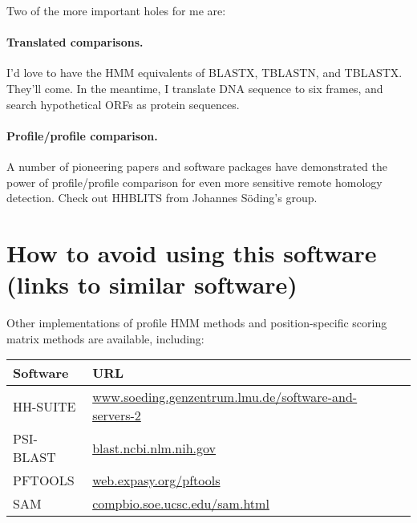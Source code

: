Two of the more important holes for me are:

\paragraph{Translated comparisons.} I'd love to have the HMM
equivalents of BLASTX, TBLASTN, and TBLASTX. They'll come. In the
meantime, I translate DNA sequence to six frames, and search
hypothetical ORFs as protein sequences.

\paragraph{Profile/profile comparison.} A number of pioneering papers and
software packages have demonstrated the power of profile/profile
comparison for even more sensitive remote homology detection.  Check
out HHBLITS from Johannes S\"oding's
group.



\section{How to avoid using this software (links to similar software)}

Other implementations of profile HMM methods and position-specific
scoring matrix methods are available, including:

\begin{center}
\begin{tabular}{lp{5in}l}
Software  &   URL \\ \hline
HH-SUITE  & \href{http://www.soeding.genzentrum.lmu.de/software-and-servers-2/}{www.soeding.genzentrum.lmu.de/software-and-servers-2}\\
PSI-BLAST & \href{https://blast.ncbi.nlm.nih.gov/}{blast.ncbi.nlm.nih.gov}\\
PFTOOLS   & \href{http://web.expasy.org/pftools/}{web.expasy.org/pftools}\\
SAM       & \href{https://compbio.soe.ucsc.edu/sam.html}{compbio.soe.ucsc.edu/sam.html}\\
\end{tabular}
\end{center}





  









